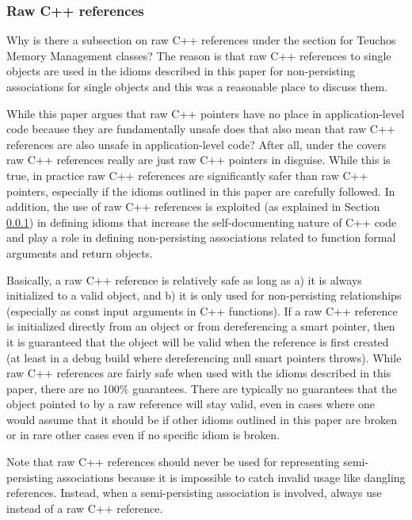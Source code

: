 \documentclass[pdf,ps2pdf,11pt]{SANDreport}
\begin{document}
%
{}\subsubsection{Raw C++ references}
\label{sec:raw-C++-references}
%

Why is there a subsection on raw C++ references under the section for
Teuchos Memory Management classes?  The reason is that raw C++
references to single objects are used in the idioms described in this
paper for non-persisting associations for single objects and this was
a reasonable place to discuss them.

While this paper argues that raw C++ pointers have no place in
application-level code because they are fundamentally unsafe does that
also mean that raw C++ references are also unsafe in application-level
code?  After all, under the covers raw C++ references really are just
raw C++ pointers in disguise.  While this is true, in practice raw C++
references are significantly safer than raw C++ pointers, especially
if the idioms outlined in this paper are carefully followed.  In
addition, the use of raw C++ references is exploited (as explained in
Section {}\ref{sec:raw-C++-references}) in defining idioms that
increase the self-documenting nature of C++ code and play a role in
defining non-persisting associations related to function formal
arguments and return objects.

Basically, a raw C++ reference is relatively safe as long as a) it is
always initialized to a valid object, and b) it is only used for
non-persisting relationships (especially as const input arguments in
C++ functions).  If a raw C++ reference is initialized directly from
an object or from dereferencing a smart pointer, then it is guaranteed
that the object will be valid when the reference is first created (at
least in a debug build where dereferencing null smart pointers
throws).  While raw C++ references are fairly safe when used with the
idioms described in this paper, there are no 100\% guarantees.  There
are typically no guarantees that the object pointed to by a raw
reference will stay valid, even in cases where one would assume that
it should be if other idioms outlined in this paper are broken or in
rare other cases even if no specific idiom is broken.

Note that raw C++ references should never be used for representing
semi-persisting associations because it is impossible to catch invalid
usage like dangling references.  Instead, when a semi-persisting
association is involved, always use {} instead of a raw C++
reference.
\end{document}
